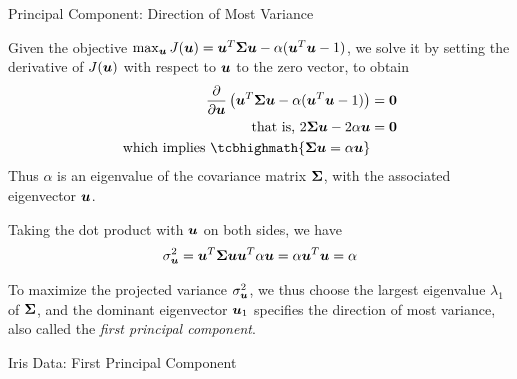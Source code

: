 \begin{frame}{Principal Component: Direction of Most Variance}

  Given the objective $\max_{\boldsymbol u} J({\boldsymbol u}) =  
  {\boldsymbol u}^T {\bm \Sigma} {\boldsymbol u} - \alpha ({\boldsymbol u}^T{\boldsymbol u}-1)$, we solve it by
setting the derivative of $J({\boldsymbol u})$
with respect to ${\boldsymbol u}$ to the zero vector, to obtain
\begin{align*}
  \frac{\partial}{\partial \bu} \lB(\bu^T \cov \bu - \alpha
  (\bu^T\bu-1)\rB) & = \bzero\\
  \text{that is, }2 \cov \bu - 2 \alpha \bu  &= \bzero \\
  \text{which implies } 
\tcbhighmath{
\cov \bu  = \alpha \bu
}
\end{align*}
Thus $\alpha$ is an eigenvalue of the covariance matrix
${\bm \Sigma}$, with the associated eigenvector ${\boldsymbol u}$.

\medskip
Taking the dot product with ${\boldsymbol u}$ on both sides, we have
\begin{align*}
\sigma^2_{\boldsymbol u}  = {\boldsymbol u}^T{\bm \Sigma}{\boldsymbol u}  {\boldsymbol u}^T \alpha {\boldsymbol u} = 
\alpha {\boldsymbol u}^T{\boldsymbol u} =  \alpha
\end{align*}

\medskip
To maximize the projected variance $\sigma_{\boldsymbol u}^2$,
we thus choose the largest eigenvalue $\lambda_1$ of ${\bm \Sigma}$, and
the dominant eigenvector ${\boldsymbol u}_1$ specif\/{i}es the
direction of most variance, also called the
{\em f\/{i}rst principal
component}.
\end{frame}


\begin{frame}{Iris Data: First Principal Component}
  \centerline{
}
\end{frame}



